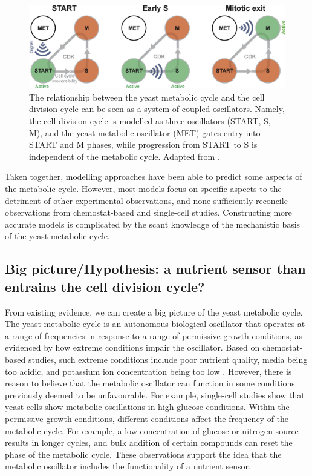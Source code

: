\begin{figure}[h!]
  \centering
  \includegraphics[width=1.0\textwidth]{ozsezenInferenceHighLevelInteraction2019_7}
  \caption[
    The relationship between the yeast metabolic cycle and the cell division cycle can be seen as a system of coupled oscillators
  ]{
    The relationship between the yeast metabolic cycle and the cell division cycle can be seen as a system of coupled oscillators.
    Namely, the cell division cycle is modelled as three oscillators (START, S, M), and the yeast metabolic oscillator (MET) gates entry into START and M phases, while progression from START to S is independent of the metabolic cycle.
    Adapted from \textcite{ozsezenInferenceHighLevelInteraction2019}.}
  \label{fig:intro-ymc-coupled_oscillators}
\end{figure}

Taken together, modelling approaches have been able to predict some aspects of the metabolic cycle.
However, most models focus on specific aspects to the detriment of other experimental observations, and none sufficiently reconcile observations from chemostat-based and single-cell studies.
Constructing more accurate models is complicated by the scant knowledge of the mechanistic basis of the yeast metabolic cycle.

\subsection[Big picture/Hypothesis]{Big picture/Hypothesis: a nutrient sensor than entrains the cell division cycle?}
\label{subsec:intro-ymc-hypothesis}

From existing evidence, we can create a big picture of the yeast metabolic cycle.
The yeast metabolic cycle is an autonomous biological oscillator that operates at a range of frequencies in response to a range of permissive growth conditions, as evidenced by how extreme conditions impair the oscillator.
Based on chemostat-based studies, such extreme conditions include poor nutrient quality, media being too acidic, and potassium ion concentration being too low \parencite{oneillEukaryoticCellBiology2020}.
However, there is reason to believe that the metabolic oscillator can function in some conditions previously deemed to be unfavourable.
For example, single-cell studies show that yeast cells show metabolic oscillations in high-glucose conditions.
Within the permissive growth conditions, different conditions affect the frequency of the metabolic cycle.
For example, a low concentration of glucose or nitrogen source results in longer cycles, and bulk addition of certain compounds can reset the phase of the metabolic cycle.
These observations support the idea that the metabolic oscillator includes the functionality of a nutrient sensor.


